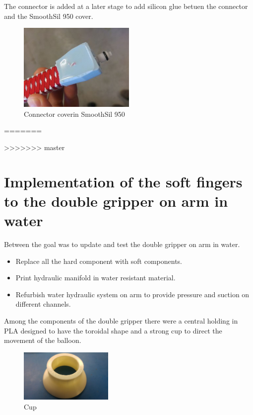 \documentclass{article}
\begin{document}
The connector is added at a later stage to add silicon glue betuen the connector and the SmoothSil 950 cover.
\begin{figure}[h]
	\centering
	\includegraphics[width=0.5\textwidth]{Pictures/fingerOnToroidal/ConnectorCover.jpg}
	\caption{Connector coverin SmoothSil 950}
	\label{fig:connectorCover}
\end{figure}

=======
 
>>>>>>> master

\newpage

\section{Implementation of the soft fingers to the double gripper on arm in water}
Between the goal was to update and test the double gripper on arm in water.
\begin{itemize}
    \item	Replace all the hard component with soft components.
    \item	Print hydraulic manifold in water resistant material.
    \item	Refurbish water hydraulic system on arm to provide pressure and suction on different channels.
\end{itemize}

Among the components of the double gripper there were a central holding in PLA designed to have the toroidal shape and a strong cup to direct the movement of the balloon.\\
\begin{figure}[h]
    \centering
    \includegraphics[width=0.4\textwidth]{Pictures/fingerOnToroidal/cup.jpg}
    \caption{Cup}
    \label{fig:cup}
\end{figure}
\end{document}
